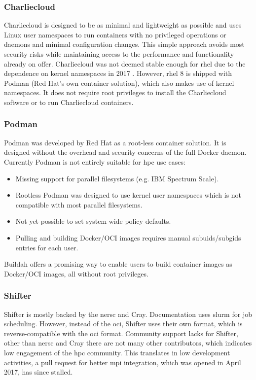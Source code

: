 \documentclass[12pt]{article}
\begin{document}
\subsubsection{Charliecloud}
Charliecloud is designed to be as minimal and lightweight as possible and uses Linux user namespaces to run containers with no privileged operations or daemons and minimal configuration changes. This simple approach avoids most security risks while maintaining access to the performance and functionality already on offer. Charliecloud was not deemed stable enough for \gls{rhel} due to the dependence on kernel namespaces in 2017 \cite{kurtzer2017singularity}. However, \gls{rhel} 8 is shipped with Podman (Red Hat's own container solution), which also makes use of kernel namespaces. It does not require root privileges to install the Charliecloud software or to run Charliecloud containers.


\subsubsection{Podman}
Podman was developed by Red Hat as a root-less container solution. It is designed without the overhead and security concerns of the full Docker daemon. Currently Podman is not entirely suitable for \gls{hpc} use cases:
\begin{itemize}
    \item Missing support for parallel filesystems (e.g. IBM Spectrum Scale).
    \item Rootless Podman was designed to use kernel user namespaces which is not compatible with most parallel filesystems.
    \item Not yet possible to set system wide policy defaults.
    \item Pulling and building Docker/OCI images requires manual subuids/subgids entries for each user.
\end{itemize}
Buildah offers a promising way to enable users to build container images as Docker/OCI images, all without root privileges.


\subsubsection{Shifter}
Shifter is mostly backed by the \gls{nersc} and Cray. Documentation uses \gls{slurm} for job scheduling. However, instead of the \gls{oci}, Shifter uses their own format, which is reverse-compatible with the \gls{oci} format. Community support lacks for Shifter, other than \gls{nersc} and Cray there are not many other contributors, which indicates low engagement of the \gls{hpc} community. This translates in low development activities, a pull request for better \gls{mpi} integration, which was opened in April 2017, has since stalled.
\end{document}
